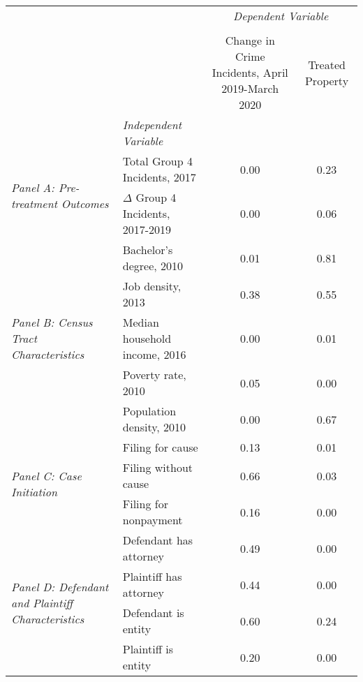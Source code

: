 \begin{tabular}{llcc}
\toprule
 &  & \multicolumn{2}{c}{\textit{Dependent Variable}} \\
\cline{3-4}
\\
 &  & Change in Crime Incidents, April 2019-March 2020 & Treated Property \\
 & \emph{Independent Variable} &  &  \\
\midrule
\multirow[c]{2}{3cm}{\textit{Panel A: Pre-treatment Outcomes}} & Total Group 4 Incidents, 2017 & 0.00 & 0.23 \\
 & $\Delta$ Group 4 Incidents, 2017-2019 & 0.00 & 0.06 \\
\cline{1-4}
\multirow[c]{5}{3cm}{\textit{Panel B: Census Tract Characteristics}} & Bachelor's degree, 2010 & 0.01 & 0.81 \\
 & Job density, 2013 & 0.38 & 0.55 \\
 & Median household income, 2016 & 0.00 & 0.01 \\
 & Poverty rate, 2010 & 0.05 & 0.00 \\
 & Population density, 2010 & 0.00 & 0.67 \\
\cline{1-4}
\multirow[c]{3}{3cm}{\textit{Panel C: Case Initiation}} & Filing for cause & 0.13 & 0.01 \\
 & Filing without cause & 0.66 & 0.03 \\
 & Filing for nonpayment & 0.16 & 0.00 \\
\cline{1-4}
\multirow[c]{4}{3cm}{\textit{Panel D: Defendant and Plaintiff Characteristics}} & Defendant has attorney & 0.49 & 0.00 \\
 & Plaintiff has attorney & 0.44 & 0.00 \\
 & Defendant is entity & 0.60 & 0.24 \\
 & Plaintiff is entity & 0.20 & 0.00 \\
\cline{1-4}
\bottomrule
\end{tabular}
